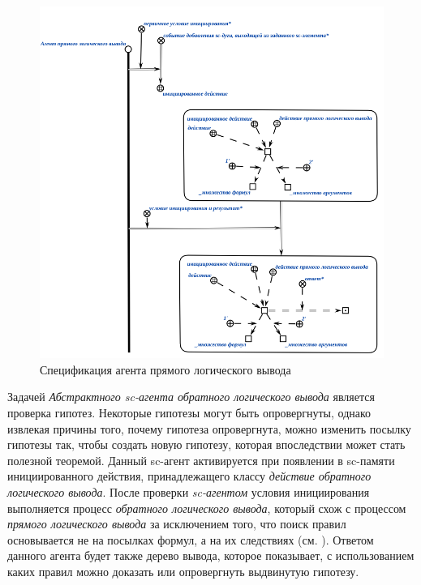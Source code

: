 \begin{figure}[http]
	\includegraphics[scale=0.8]{author/part3/figures/direct_inference_agent.png}
	\caption{Спецификация агента прямого логического вывода}
	\label{fig:direct_inference_agent}
\end{figure}

Задачей \textit{Абстрактного sc-агента обратного логического вывода} является проверка гипотез. Некоторые гипотезы могут быть опровергнуты, однако извлекая причины того, почему гипотеза опровергнута, можно изменить посылку гипотезы так, чтобы создать новую гипотезу, которая впоследствии может стать полезной теоремой. Данный sc-агент активируется при появлении в sc-памяти инициированного действия, принадлежащего классу \textit{действие обратного логического вывода}. После проверки \textit{sc-агентом} условия инициирования выполняется процесс \textit{обратного логического вывода}, который схож с процессом \textit{прямого логического вывода} за исключением того, что поиск правил основывается не на посылках формул, а на их следствиях (см. ). Ответом данного агента будет также дерево вывода, которое показывает, с использованием каких правил можно доказать или опровергнуть выдвинутую гипотезу.

